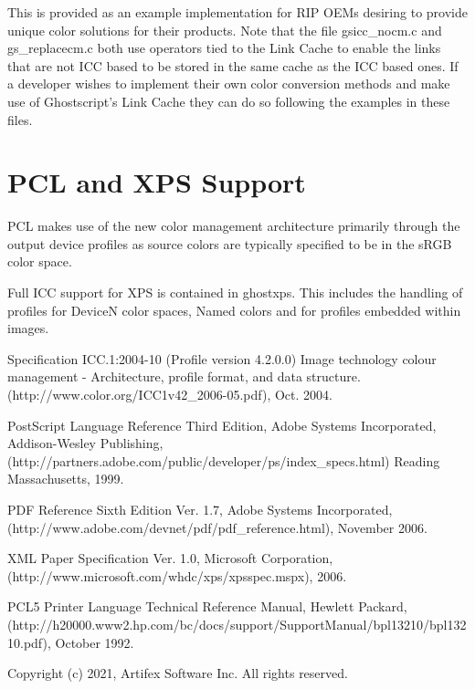 \documentclass[12pt,notitlepage]{article}
\begin{document}
This is provided as an example implementation for RIP OEMs desiring to provide unique color solutions for their products.
Note that the file gsicc\_nocm.c and gs\_replacecm.c both use operators tied to the Link Cache to enable the links that are not ICC based to be stored in the same cache as the ICC based ones.  If a developer wishes to implement their own color conversion methods and make use of Ghostscript's Link Cache they can do so following the examples in these files.

\section{PCL and XPS Support}

PCL\cite{PCL} makes use of the new color management architecture primarily through the output device profiles as source colors are typically specified to be in the sRGB color space.

Full ICC support for XPS\cite{XPS} is contained in ghostxps. This includes the handling of profiles for DeviceN color spaces, Named colors and for profiles embedded within images.

\begin{thebibliography}{99}

 Specification ICC.1:2004-10 (Profile version 4.2.0.0) Image technology colour management - Architecture, profile format, and data structure.
(http://www.color.org/ICC1v42\_2006-05.pdf), Oct. 2004.

 PostScript Language Reference Third Edition, Adobe Systems Incorporated, Addison-Wesley Publishing, (http://partners.adobe.com/public/developer/ps/index\_specs.html)
Reading Massachusetts, 1999.

 PDF Reference Sixth Edition Ver. 1.7, Adobe Systems Incorporated, (http://www.adobe.com/devnet/pdf/pdf\_reference.html), November 2006.

 XML Paper Specification Ver. 1.0, Microsoft Corporation, (http://www.microsoft.com/whdc/xps/xpsspec.mspx), 2006.

 PCL5 Printer Language Technical Reference Manual, Hewlett Packard, (http://h20000.www2.hp.com/bc/docs/support/SupportManual/bpl13210/bpl13210.pdf), October 1992.

\end{thebibliography}

\vspace*{1.25in}
Copyright (c) 2021, Artifex Software Inc. All rights reserved.
\end{document}
